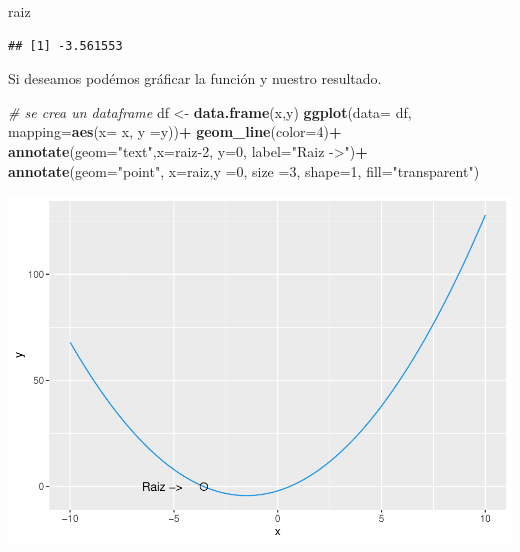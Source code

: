 \documentclass[11pt,]{article}
\newenvironment{Shaded}{\begin{snugshade}}{\end{snugshade}}
\newcommand{\CommentTok}[1]{\textcolor[rgb]{0.56,0.35,0.01}{\textit{#1}}}
\newcommand{\DataTypeTok}[1]{\textcolor[rgb]{0.13,0.29,0.53}{#1}}
\newcommand{\DecValTok}[1]{\textcolor[rgb]{0.00,0.00,0.81}{#1}}
\newcommand{\KeywordTok}[1]{\textcolor[rgb]{0.13,0.29,0.53}{\textbf{#1}}}
\newcommand{\NormalTok}[1]{#1}
\newcommand{\OperatorTok}[1]{\textcolor[rgb]{0.81,0.36,0.00}{\textbf{#1}}}
\newcommand{\StringTok}[1]{\textcolor[rgb]{0.31,0.60,0.02}{#1}}
\begin{document}
\begin{Shaded}
\begin{Highlighting}[]
\NormalTok{raiz}
\end{Highlighting}
\end{Shaded}

\begin{verbatim}
## [1] -3.561553
\end{verbatim}

Si deseamos podémos gráficar la función y nuestro resultado.

\begin{Shaded}
\begin{Highlighting}[]
\CommentTok{# se crea un dataframe}
\NormalTok{df <-}\StringTok{ }\KeywordTok{data.frame}\NormalTok{(x,y)  }
\KeywordTok{ggplot}\NormalTok{(}\DataTypeTok{data=}\NormalTok{ df, }\DataTypeTok{mapping=}\KeywordTok{aes}\NormalTok{(}\DataTypeTok{x=}\NormalTok{ x, }\DataTypeTok{y =}\NormalTok{y))}\OperatorTok{+}
\StringTok{  }\KeywordTok{geom_line}\NormalTok{(}\DataTypeTok{color=}\DecValTok{4}\NormalTok{)}\OperatorTok{+}
\StringTok{  }\KeywordTok{annotate}\NormalTok{(}\DataTypeTok{geom=}\StringTok{"text"}\NormalTok{,}\DataTypeTok{x=}\NormalTok{raiz}\DecValTok{-2}\NormalTok{, }\DataTypeTok{y=}\DecValTok{0}\NormalTok{, }\DataTypeTok{label=}\StringTok{"Raiz ->"}\NormalTok{)}\OperatorTok{+}
\StringTok{  }\KeywordTok{annotate}\NormalTok{(}\DataTypeTok{geom=}\StringTok{"point"}\NormalTok{, }\DataTypeTok{x=}\NormalTok{raiz,}\DataTypeTok{y =}\DecValTok{0}\NormalTok{, }\DataTypeTok{size =}\DecValTok{3}\NormalTok{, }\DataTypeTok{shape=}\DecValTok{1}\NormalTok{, }\DataTypeTok{fill=}\StringTok{"transparent"}\NormalTok{)}
\end{Highlighting}
\end{Shaded}

\includegraphics{Bisección_files/figure-latex/unnamed-chunk-4-1.pdf}

\newpage
\singlespacing 
\end{document}
